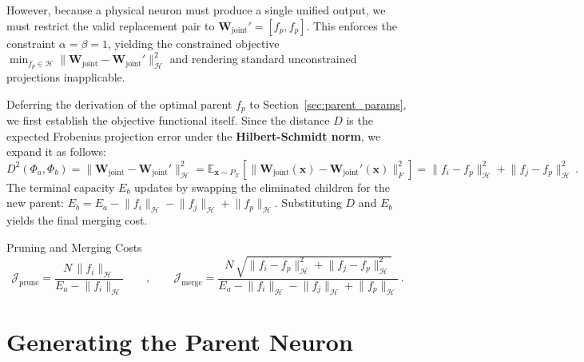 \documentclass[11pt, a4paper, copyright, gdm]{google}
\newcommand{\normshort}[1]{\lVert#1\rVert}
\newcommand{\xVect}{\boldsymbol{x}}
\newcommand{\calH}{\mathcal{H}}
\newcommand{\calJ}{\mathcal{J}}
\newcommand{\calX}{\mathcal{X}}
\newcommand{\E}{\mathbb{E}}
\newcommand{\Wall}{\boldsymbol{W}_{\text{joint}}}
\newcommand{\emc}[1]{{\textbf{\color[rgb]{0,.3,.6}#1}}}
\theoremstyle{definition}
\begin{document}
However, because a physical neuron must produce a single unified output, we must restrict the valid replacement pair to $\Wall' = [f_p, f_p]$. This enforces the constraint $\alpha = \beta = 1$, yielding the constrained objective $\min_{f_p \in \calH} \normshort{\Wall - \Wall'}^2_{\calH}$ and rendering standard unconstrained projections inapplicable. 

Deferring the derivation of the optimal parent $f_p$ to Section~\ref{sec:parent_params}, we first establish the objective functional itself. Since the distance $D$ is the expected Frobenius projection error under the \emc{Hilbert-Schmidt norm}, we expand it as follows:
\begin{equation}
D^2(\Phi_a, \Phi_b) = \normshort{\Wall - \Wall'}^2_{\calH} = \E_{\xVect \sim P_{\calX}} \left[ \normshort{\Wall(\xVect) - \Wall'(\xVect)}_F^2 \right] = \normshort{f_i - f_p}_{\calH}^2 + \normshort{f_j - f_p}_{\calH}^2 \nonumber \,.
\end{equation}
The terminal capacity $E_b$ updates by swapping the eliminated children for the new parent: $E_b = E_a - \normshort{f_i}_{\calH} - \normshort{f_j}_{\calH} + \normshort{f_p}_{\calH}$. Substituting $D$ and $E_b$ yields the final merging cost.

\begin{insight}{Pruning and Merging Costs}
\begin{equation}
\calJ_{\text{prune}} = \frac{N \, \normshort{f_i}_{\calH}}{E_a - \normshort{f_i}_{\calH}} \qquad,\qquad \calJ_{\text{merge}} = \frac{N \, \sqrt{\normshort{f_i - f_p}_{\calH}^2 + \normshort{f_j - f_p}_{\calH}^2}}{E_a - \normshort{f_i}_{\calH} - \normshort{f_j}_{\calH} + \normshort{f_p}_{\calH}} \,.
\end{equation}
\end{insight}

\section{Generating the Parent Neuron}
\label{sec:parent_neuron}
\end{document}
